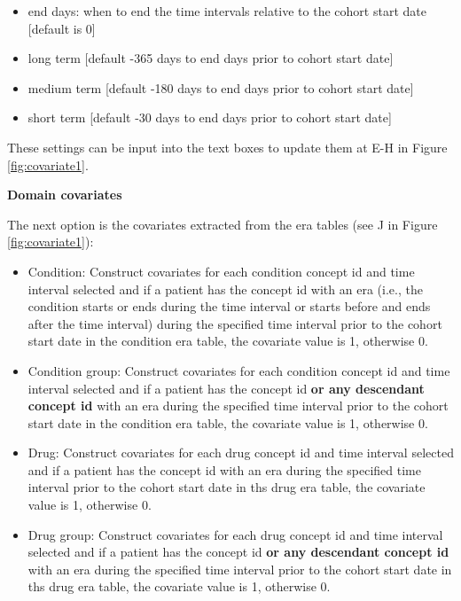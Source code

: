 \documentclass[11pt]{book}
\providecommand{\tightlist}{%
  \setlength{\itemsep}{0pt}\setlength{\parskip}{0pt}}
\begin{document}
\begin{itemize}
\tightlist
\item
  end days: when to end the time intervals relative to the cohort start
  date {[}default is 0{]}
\item
  long term {[}default -365 days to end days prior to cohort start
  date{]}
\item
  medium term {[}default -180 days to end days prior to cohort start
  date{]}
\item
  short term {[}default -30 days to end days prior to cohort start
  date{]}
\end{itemize}

These settings can be input into the text boxes to update them at E-H in
Figure \ref{fig:covariate1}.

\textbf{Domain covariates}

The next option is the covariates extracted from the era tables (see J
in Figure \ref{fig:covariate1}):

\begin{itemize}
\tightlist
\item
  Condition: Construct covariates for each condition concept id and time
  interval selected and if a patient has the concept id with an era
  (i.e., the condition starts or ends during the time interval or starts
  before and ends after the time interval) during the specified time
  interval prior to the cohort start date in the condition era table,
  the covariate value is 1, otherwise 0.
\item
  Condition group: Construct covariates for each condition concept id
  and time interval selected and if a patient has the concept id
  \textbf{or any descendant concept id} with an era during the specified
  time interval prior to the cohort start date in the condition era
  table, the covariate value is 1, otherwise 0.
\item
  Drug: Construct covariates for each drug concept id and time interval
  selected and if a patient has the concept id with an era during the
  specified time interval prior to the cohort start date in ths drug era
  table, the covariate value is 1, otherwise 0.
\item
  Drug group: Construct covariates for each drug concept id and time
  interval selected and if a patient has the concept id \textbf{or any
  descendant concept id} with an era during the specified time interval
  prior to the cohort start date in ths drug era table, the covariate
  value is 1, otherwise 0.
\end{itemize}
\end{document}
